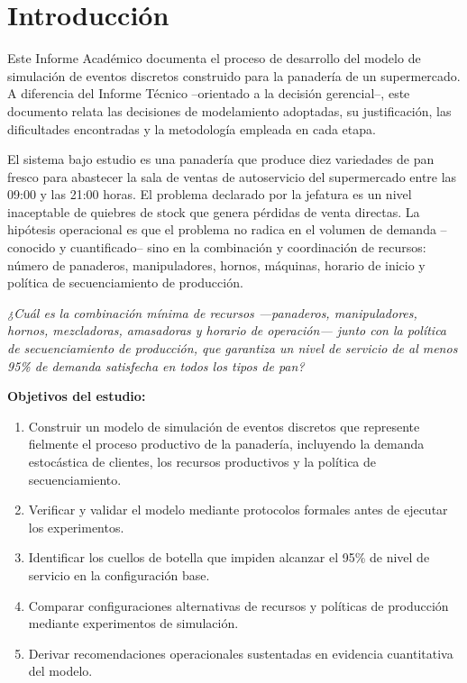 \documentclass[12pt]{article}
\begin{document}
\tableofcontents

\newpage
\section{Introducción}

Este Informe Académico documenta el proceso de desarrollo del modelo de simulación de eventos discretos construido para la panadería de un supermercado. A diferencia del Informe Técnico --orientado a la decisión gerencial--, este documento relata las decisiones de modelamiento adoptadas, su justificación, las dificultades encontradas y la metodología empleada en cada etapa.

El sistema bajo estudio es una panadería que produce diez variedades de pan fresco para abastecer la sala de ventas de autoservicio del supermercado entre las 09:00 y las 21:00 horas. El problema declarado por la jefatura es un nivel inaceptable de quiebres de stock que genera pérdidas de venta directas. La hipótesis operacional es que el problema no radica en el volumen de demanda --conocido y cuantificado-- sino en la combinación y coordinación de recursos: número de panaderos, manipuladores, hornos, máquinas, horario de inicio y política de secuenciamiento de producción.

\medskip
\noindent\colorbox{grisclaro}{%
\parbox{\dimexpr\linewidth-2\fboxsep\relax}{%
\vspace{2pt}
\textit{¿Cuál es la combinación mínima de recursos ---panaderos, manipuladores, hornos, mezcladoras, amasadoras y horario de operación--- junto con la política de secuenciamiento de producción, que garantiza un nivel de servicio de al menos 95\% de demanda satisfecha en todos los tipos de pan?}
\vspace{2pt}
}}

\medskip
\noindent\textbf{Objetivos del estudio:}
\begin{enumerate}
  \item Construir un modelo de simulación de eventos discretos que represente fielmente el proceso productivo de la panadería, incluyendo la demanda estocástica de clientes, los recursos productivos y la política de secuenciamiento.
  \item Verificar y validar el modelo mediante protocolos formales antes de ejecutar los experimentos.
  \item Identificar los cuellos de botella que impiden alcanzar el 95\% de nivel de servicio en la configuración base.
  \item Comparar configuraciones alternativas de recursos y políticas de producción mediante experimentos de simulación.
  \item Derivar recomendaciones operacionales sustentadas en evidencia cuantitativa del modelo.
\end{enumerate}
\end{document}
